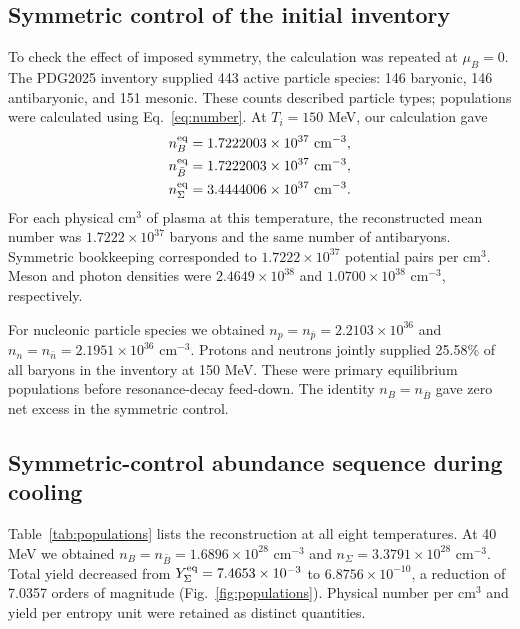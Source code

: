 

\subsection{Symmetric control of the initial inventory}
To check the effect of imposed symmetry, the calculation was repeated at $\mu_B=0$. The PDG2025 inventory supplied 443 active particle species: 146 baryonic, 146 antibaryonic, and 151 mesonic. These counts described particle types; populations were calculated using Eq.~\eqref{eq:number}. At $T_i=150$ MeV, our calculation gave
\begin{align}
n_B^{\rm eq}&=1.7222003\times10^{37}\ {\rm cm^{-3}},\\
n_{\bar B}^{\rm eq}&=1.7222003\times10^{37}\ {\rm cm^{-3}},\\
n_\Sigma^{\rm eq}&=3.4444006\times10^{37}\ {\rm cm^{-3}}.
\label{eq:initialpopulation}
\end{align}
For each physical cm$^3$ of plasma at this temperature, the reconstructed mean number was $1.7222\times10^{37}$ baryons and the same number of antibaryons. Symmetric bookkeeping corresponded to $1.7222\times10^{37}$ potential pairs per cm$^3$. Meson and photon densities were $2.4649\times10^{38}$ and $1.0700\times10^{38}$ cm$^{-3}$, respectively.

For nucleonic particle species we obtained $n_p=n_{\bar p}=2.2103\times10^{36}$ and $n_n=n_{\bar n}=2.1951\times10^{36}$ cm$^{-3}$. Protons and neutrons jointly supplied 25.58\% of all baryons in the inventory at 150 MeV. These were primary equilibrium populations before resonance-decay feed-down. The identity $n_B=n_{\bar B}$ gave zero net excess in the symmetric control.

\subsection{Symmetric-control abundance sequence during cooling}
Table~\ref{tab:populations} lists the reconstruction at all eight temperatures. At 40 MeV we obtained $n_B=n_{\bar B}=1.6896\times10^{28}$ cm$^{-3}$ and $n_\Sigma=3.3791\times10^{28}$ cm$^{-3}$. Total yield decreased from $Y_\Sigma^{\rm eq}=7.4653\times10^{-3}$ to $6.8756\times10^{-10}$, a reduction of 7.0357 orders of magnitude (Fig.~\ref{fig:populations}). Physical number per cm$^3$ and yield per entropy unit were retained as distinct quantities.

